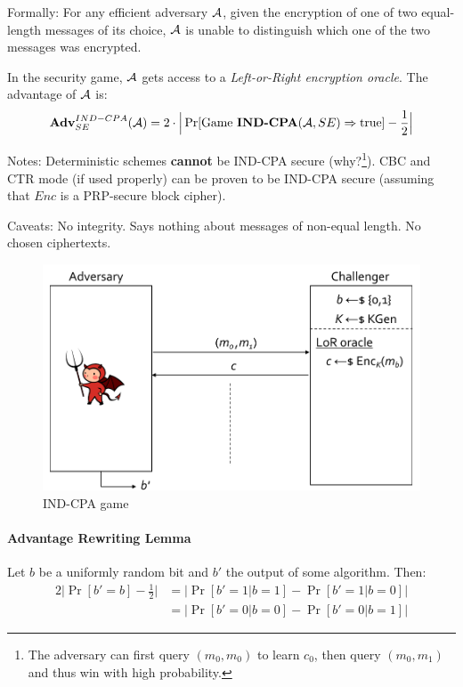 Formally:
For any efficient adversary $\mathcal{A}$, given the encryption of one of two equal-length messages of its choice,
$\mathcal{A}$ is unable to distinguish which one of the two messages was encrypted.

In the security game, $\mathcal{A}$ gets access to a \emph{Left-or-Right encryption oracle}.
The advantage of $\mathcal{A}$ is:
$$
\mathbf{Adv}^{IND-CPA}_{SE} (\mathcal{A})
= 2 \cdot \Big| \Pr[ \text{Game }\textbf{IND-CPA}(\mathcal{A}, SE) \Rightarrow \text{true} ] - \frac{1}{2} \Big|
$$

Notes:
Deterministic schemes \textbf{cannot} be IND-CPA secure (why?\footnote{The adversary can first query $(m_0, m_0)$ to learn $c_0$, then query $(m_0, m_1)$ and thus win with high probability.}).
CBC and CTR mode (if used properly) can be proven to be IND-CPA secure (assuming that $Enc$ is a PRP-secure block cipher).

Caveats:
No integrity. Says nothing about messages of non-equal length. No chosen ciphertexts.

\begin{figure}[h]
    \centering
	\includegraphics[scale=0.4]{images/ind-cpa.png}
    \caption{IND-CPA game}
    \label{fig:ind-cpa}
\end{figure}

\paragraph{Advantage Rewriting Lemma}\label{adv-rewr-lemm}
Let $b$ be a uniformly random bit and $b'$ the output of some algorithm. Then:
\begin{align*}
2 \Big| \Pr[b'=b] - \frac{1}{2} \Big|
&= \Big| \Pr[b'=1|b=1] - \Pr[b'=1|b=0] \Big| \\
&= \Big| \Pr[b'=0|b=0] - \Pr[b'=0|b=1] \Big|
\end{align*}

